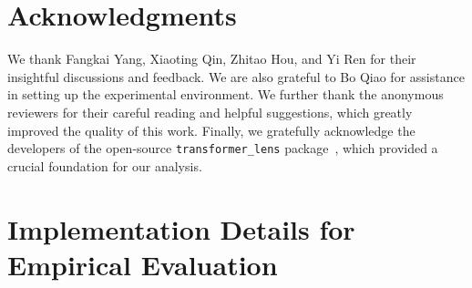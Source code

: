 \documentclass[11pt]{article}
\begin{document}
\section*{Acknowledgments}
We thank Fangkai Yang, Xiaoting Qin, Zhitao Hou, and Yi Ren for their insightful discussions and feedback. We are also grateful to Bo Qiao for assistance in setting up the experimental environment. We further thank the anonymous reviewers for their careful reading and helpful suggestions, which greatly improved the quality of this work. Finally, we gratefully acknowledge the developers of the open-source \texttt{transformer\_lens} package~\cite{nanda2022transformerlens}, which provided a crucial foundation for our analysis.




\appendix

\section{Implementation Details for Empirical Evaluation}
\label{app:quality_impact}
\end{document}
